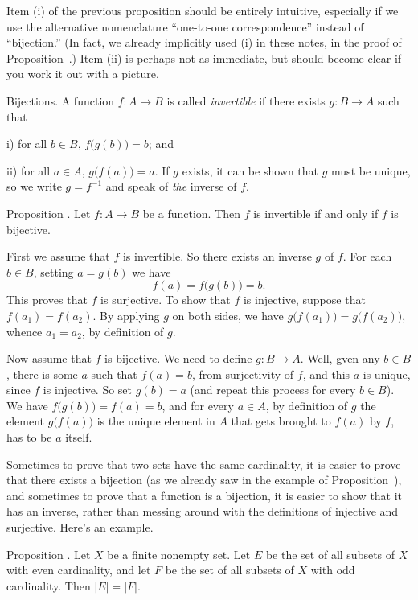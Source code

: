 Item (i) of the previous proposition should be entirely intuitive, especially if we use the alternative
nomenclature ``one-to-one correspondence'' instead of ``bijection.'' (In fact, we already implicitly
used (i) in these notes, in the proof of Proposition~{\propcardpowerset}.) Item (ii) is perhaps not
as immediate, but should become clear if you work it out with a picture.

\medskip\boldlabel Bijections.
A function $f:A\to B$ is called {\it invertible} if there exists $g:B\to A$ such that
\medskip
\item{i)} for all $b\in B$, $f\bigl(g(b)\bigr) = b$; and
\smallskip
\item{ii)} for all $a\in A$, $g\bigl(f(a)\bigr) = a$.
\medskip
If $g$ exists, it can be shown that $g$ must be unique, so we write $g = f^{-1}$ and speak of
{\it the} inverse of $f$.

\proclaim Proposition \advthm. Let $f:A\to B$ be a function. Then $f$ is invertible
if and only if $f$ is bijective.

\proof First we assume that $f$ is invertible. So there exists an inverse $g$ of $f$. For each $b\in B$,
setting $a = g(b)$ we have
$$f(a) = f\bigl(g(b)\bigr) = b.$$
This proves that $f$ is surjective. To show that $f$ is injective, suppose that $f(a_1) = f(a_2)$.
By applying $g$ on both sides, we have $g\bigl(f(a_1)\bigr) = g\bigl(f(a_2)\bigr)$, whence
$a_1 = a_2$, by definition of $g$.

Now assume that $f$ is bijective. We need to define $g:B\to A$. Well, gven any $b\in B$, there is
some $a$ such that $f(a) = b$, from surjectivity of $f$, and this $a$ is unique, since $f$ is
injective. So set $g(b) = a$ (and repeat this process for every $b\in B$). We have
$f\bigl(g(b)\bigr) = f(a) = b$, and for every $a\in A$, by definition of $g$ the
element $g\bigl(f(a)\bigr)$ is the unique element in $A$ that gets brought to $f(a)$ by $f$,
has to be $a$ itself.\slug

Sometimes to prove that two sets have the same cardinality, it is easier to prove that there
exists a bijection (as we already saw in the example of Proposition~{\propcardpowerset}),
and sometimes to prove that a function is a bijection, it is easier to show that it has an inverse,
rather than messing around with the definitions of injective and surjective.
Here's an example.

\proclaim Proposition \advthm. Let $X$ be a finite nonempty set. Let $E$ be the set of all subsets of $X$ with
even cardinality, and let $F$ be the set of all subsets of $X$ with odd cardinality.
Then $|E| = |F|$.

